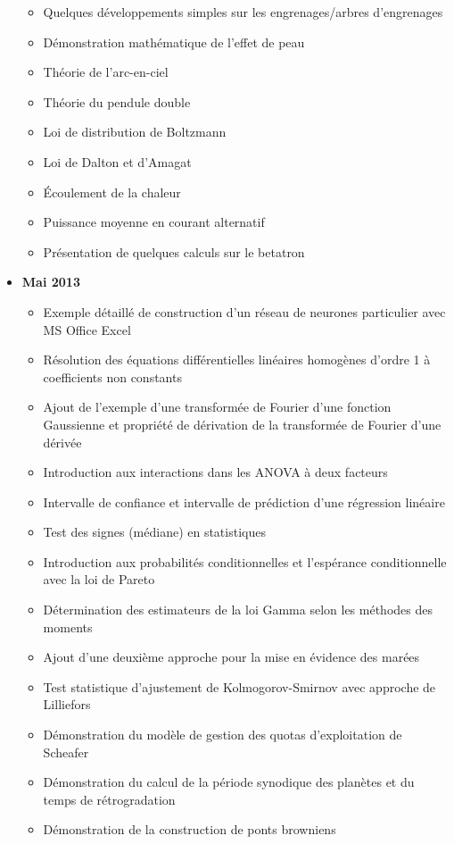 \begin{itemize}
\begin{itemize}[noitemsep]
				\item Quelques développements simples sur les engrenages/arbres d'engrenages
				\item Démonstration mathématique de l'effet de peau
				\item Théorie de l'arc-en-ciel
				\item Théorie du pendule double
				\item Loi de distribution de Boltzmann
				\item Loi de Dalton et d'Amagat
				\item Écoulement de la chaleur
				\item Puissance moyenne en courant alternatif
				\item Présentation de quelques calculs sur le betatron
			\end{itemize}
		\item \textbf{Mai 2013}
			\begin{itemize}[noitemsep]
				\item Exemple détaillé de construction d'un réseau de neurones particulier avec MS Office Excel
				\item Résolution des équations différentielles linéaires homogènes d'ordre 1 à coefficients non constants
				\item Ajout de l'exemple d'une transformée de Fourier d'une fonction Gaussienne et propriété de dérivation de la transformée de Fourier d'une dérivée
				\item Introduction aux interactions dans les ANOVA à deux facteurs
				\item Intervalle de confiance et intervalle de prédiction d'une régression linéaire
				\item Test des signes (médiane) en statistiques
				\item Introduction aux probabilités conditionnelles et l'espérance conditionnelle avec la loi de Pareto
				\item Détermination des estimateurs de la loi Gamma selon les méthodes des moments
				\item Ajout d'une deuxième approche pour la mise en évidence des marées
				\item Test statistique d'ajustement de Kolmogorov-Smirnov avec approche de Lilliefors
				\item Démonstration du modèle de gestion des quotas d'exploitation de Scheafer
				\item Démonstration du calcul de la période synodique des planètes et du temps de rétrogradation
				\item Démonstration de la construction de ponts browniens

\end{itemize}
\end{itemize}
